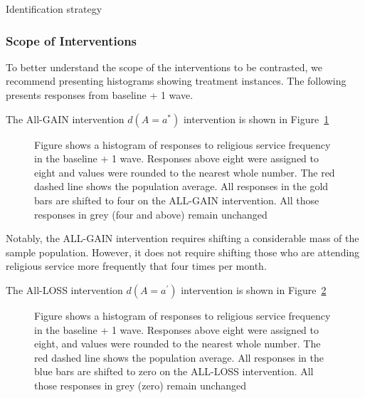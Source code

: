\documentclass[
  single column]{article}
\begin{document}
\begin{table}

\caption{\label{tbl-identification}Identification strategy}


\end{table}%

\subsubsection{Scope of Interventions}\label{scope-of-interventions}

To better understand the scope of the interventions to be contrasted, we
recommend presenting histograms showing treatment instances. The
following presents responses from baseline + 1 wave.

The All-GAIN intervention \(d(A=a^*)\) intervention is shown in
Figure~\ref{fig-0up}

\begin{figure}


\caption{\label{fig-0up}Figure shows a histogram of responses to
religious service frequency in the baseline + 1 wave. Responses above
eight were assigned to eight and values were rounded to the nearest
whole number. The red dashed line shows the population average. All
responses in the gold bars are shifted to four on the ALL-GAIN
intervention. All those responses in grey (four and above) remain
unchanged}

\end{figure}%

Notably, the ALL-GAIN intervention requires shifting a considerable mass
of the sample population. However, it does not require shifting those
who are attending religious service more frequently that four times per
month.

The All-LOSS intervention \(d(A=a^\prime)\) intervention is shown in
Figure~\ref{fig-0down}

\begin{figure}


\caption{\label{fig-0down}Figure shows a histogram of responses to
religious service frequency in the baseline + 1 wave. Responses above
eight were assigned to eight, and values were rounded to the nearest
whole number. The red dashed line shows the population average. All
responses in the blue bars are shifted to zero on the ALL-LOSS
intervention. All those responses in grey (zero) remain unchanged}

\end{figure}%
\end{document}
